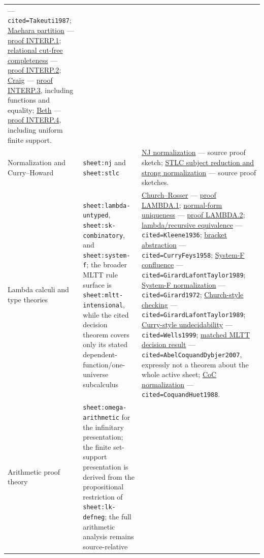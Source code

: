\begin{landscape}
\begin{longtable}{@{}p{.82in}p{2.05in}p{4.95in}@{}}
--- \texttt{cited=Takeuti1987};
\hyperref[thm:p07-maehara-partition]{Maehara partition}
--- \hyperref[annex:p7.interp.1]{proof INTERP.1};
\hyperref[thm:p07-relational-cut-free-completeness]{relational cut-free completeness}
--- \hyperref[annex:p7.interp.2]{proof INTERP.2};
\hyperref[thm:craig-interpolation]{Craig}
--- \hyperref[annex:p7.interp.3]{proof INTERP.3}, including functions and equality;
\hyperref[thm:beth]{Beth}
--- \hyperref[annex:p7.interp.4]{proof INTERP.4}, including uniform finite support. \\
\addlinespace
Normalization and Curry--Howard &
\texttt{sheet:nj} and \texttt{sheet:stlc} &
\hyperref[sec:normalization-curry-howard-01]{NJ normalization}
--- source proof sketch;
\hyperref[sec:normalization-curry-howard-02]{STLC subject reduction and strong normalization}
--- source proof sketches. \\
\addlinespace
Lambda calculi and type theories &
\texttt{sheet:lambda-untyped}, \texttt{sheet:sk-combinatory}, and
\texttt{sheet:system-f}; the broader MLTT rule surface is
\texttt{sheet:mltt-intensional}, while the cited decision theorem covers only
its stated dependent-function/one-universe subcalculus &
\hyperref[thm:p07-church-rosser]{Church--Rosser}
--- \hyperref[annex:p7.lambda.1]{proof LAMBDA.1};
\hyperref[thm:p07-beta-normal-form-unique]{normal-form uniqueness}
--- \hyperref[annex:p7.lambda.2]{proof LAMBDA.2};
\hyperref[thm:p07-lambda-partial-recursive]{lambda/recursive equivalence}
--- \texttt{cited=Kleene1936};
\hyperref[thm:p07-bracket-abstraction]{bracket abstraction}
--- \texttt{cited=CurryFeys1958};
\hyperref[thm:p07-system-f-confluence]{System-F confluence}
--- \texttt{cited=GirardLafontTaylor1989};
\hyperref[thm:p07-system-f-strong-normalization]{System-F normalization}
--- \texttt{cited=Girard1972};
\hyperref[thm:p07-system-f-church-checking]{Church-style checking}
--- \texttt{cited=GirardLafontTaylor1989};
\hyperref[thm:p07-system-f-curry-undecidable]{Curry-style undecidability}
--- \texttt{cited=Wells1999};
\hyperref[thm:p07-mltt-normalization-decision]{matched MLTT decision result}
--- \texttt{cited=AbelCoquandDybjer2007}, expressly not a theorem about the
whole active sheet;
\hyperref[thm:p07-coc-strong-normalization]{CoC normalization}
--- \texttt{cited=CoquandHuet1988}. \\
\addlinespace
Arithmetic proof theory &
\texttt{sheet:omega-arithmetic} for the infinitary presentation; the finite
set-support presentation is derived from the propositional restriction of
\texttt{sheet:lk-defneg}; the full arithmetic analysis remains source-relative &

\end{longtable}
\end{landscape}
